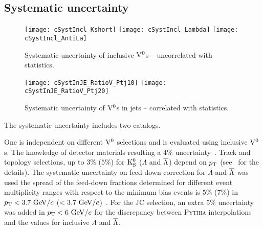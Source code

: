 \subsection{Systematic uncertainty}
\label{sec:Syst}

\begin{figure}[t]
\begin{center}
\texttt{[image: cSystIncl\_Kshort]}
\texttt{[image: cSystIncl\_Lambda]}
\texttt{[image: cSystIncl\_AntiLa]}
\caption{Systematic uncertainty of inclusive ${\rm V}^{0}$s -- uncorrelated with statistics.}
\label{fig:c06SystInclV0s}
\end{center}
\end{figure}

\begin{figure}[t]
\begin{center}
\texttt{[image: cSystInJE\_RatioV\_Ptj10]}
\texttt{[image: cSystInJE\_RatioV\_Ptj20]}
\caption{Systematic uncertainty of ${\rm V}^{0}$s in jets -- correlated with statistics.}
\label{fig:c06SystV0InJets}
\end{center}
\end{figure}

The systematic uncertainty includes two catalogs.

One is independent on different ${\rm V}^{0}$ selections and is evaluated using inclusive ${\rm V}^{0}$s.
The knowledge of detector materials resulting a $4\%$ uncertainty~\cite{Abelev:2013haa}.
Track and topology selections, up to $3\%$ ($5\%$) for ${\rm K}_{\rm S}^{0}$ ($\Lambda$ and $\overline{\Lambda}$) depend on $\pT$ (see~\cite{Abelev:2013xaa} for the details).
The systematic uncertainty on feed-down correction for $\Lambda$ and $\overline{\Lambda}$ was used the spread of the feed-down fractions determined for different event multiplicity ranges with respect to the minimum bias events is $5\%$ ($7\%$) in $\pT<3.7~\GeVc$ ($<3.7~{\rm GeV/}c$)~\cite{Abelev:2013haa}.
For the JC selection, an extra $5\%$  uncertainty was added in $\pT<6~\GeVc$ for the discrepancy between \textsc{Pythia} interpolations and the values for inclusive $\Lambda$ and $\overline{\Lambda}$.

